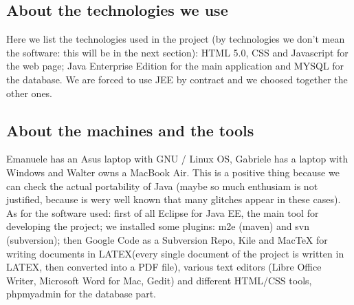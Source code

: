 \documentclass[a4paper,12pt]{article}
\begin{document}
\subsection{About the technologies we use}
Here we list the technologies used in the project (by technologies we don’t mean the software: this will be in the next section): HTML 5.0, CSS and Javascript for the web page; Java Enterprise Edition for the main application and MYSQL for the database. We are forced to use JEE by contract and we choosed together the other ones.
\subsection{About the machines and the tools}
Emanuele has an Asus laptop with GNU / Linux OS, Gabriele has a laptop with Windows and Walter owns a MacBook Air. This is a positive thing because we can check the actual portability of Java (maybe so much enthusiam is not justified, because is wery well known that many glitches appear in these cases).\\[1\baselineskip]As for the software used: first of all Eclipse for Java EE, the main tool for developing the project; we installed some plugins: m2e (maven) and svn (subversion); then Google Code as a Subversion Repo, Kile and MacTeX for writing documents in LATEX(every single document of the project is written in LATEX, then converted into a PDF file), various text editors (Libre Office Writer, Microsoft Word for Mac, Gedit) and different HTML/CSS tools, phpmyadmin for the database part.
\end{document}
